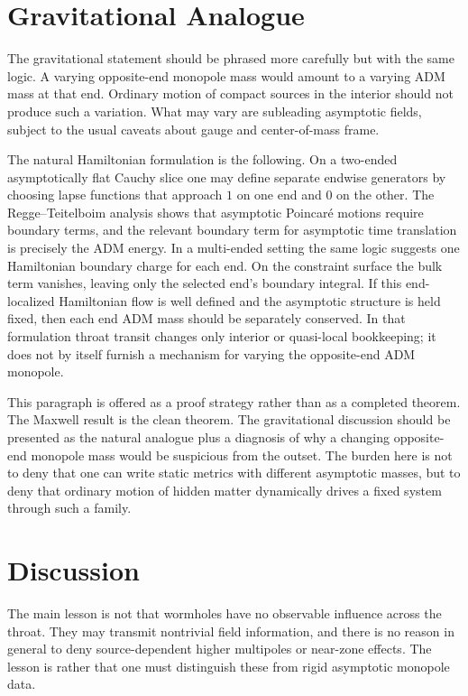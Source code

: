 \documentclass[aps,prd,onecolumn,nofootinbib,superscriptaddress]{revtex4-2}
\begin{document}
\section{Gravitational Analogue}

The gravitational statement should be phrased more carefully but with the same logic. A varying opposite-end monopole mass would amount to a varying ADM mass at that end. Ordinary motion of compact sources in the interior should not produce such a variation. What may vary are subleading asymptotic fields, subject to the usual caveats about gauge and center-of-mass frame.

The natural Hamiltonian formulation is the following. On a two-ended asymptotically flat Cauchy slice one may define separate endwise generators by choosing lapse functions that approach $1$ on one end and $0$ on the other. The Regge--Teitelboim analysis shows that asymptotic Poincar\'e motions require boundary terms, and the relevant boundary term for asymptotic time translation is precisely the ADM energy.\cite{ReggeTeitelboim1974SurfaceIntegrals} In a multi-ended setting the same logic suggests one Hamiltonian boundary charge for each end. On the constraint surface the bulk term vanishes, leaving only the selected end's boundary integral. If this end-localized Hamiltonian flow is well defined and the asymptotic structure is held fixed, then each end ADM mass should be separately conserved. In that formulation throat transit changes only interior or quasi-local bookkeeping; it does not by itself furnish a mechanism for varying the opposite-end ADM monopole.

This paragraph is offered as a proof strategy rather than as a completed theorem. The Maxwell result is the clean theorem. The gravitational discussion should be presented as the natural analogue plus a diagnosis of why a changing opposite-end monopole mass would be suspicious from the outset. The burden here is not to deny that one can write static metrics with different asymptotic masses, but to deny that ordinary motion of hidden matter dynamically drives a fixed system through such a family.\cite{Chrusciel2020ConstraintEquations}

\section{Discussion}

The main lesson is not that wormholes have no observable influence across the throat. They may transmit nontrivial field information, and there is no reason in general to deny source-dependent higher multipoles or near-zone effects. The lesson is rather that one must distinguish these from rigid asymptotic monopole data.
\end{document}
